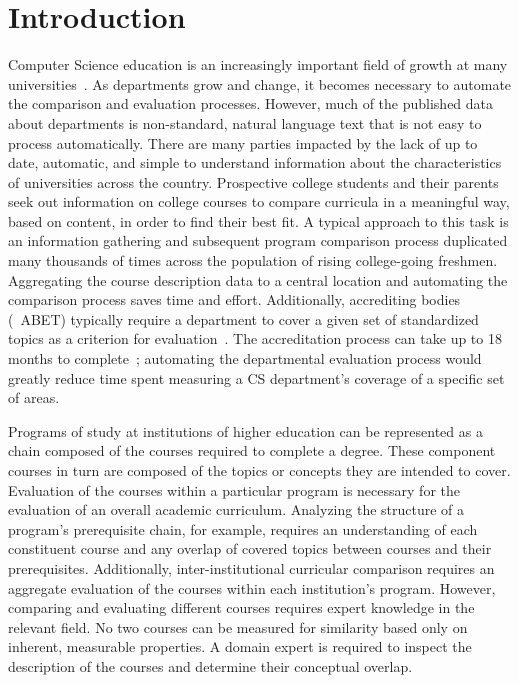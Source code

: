 \section{Introduction}
\label{sec:introduction}


Computer Science education is an increasingly important field of growth at many universities~\cite{zweben2011}.
As departments grow and change, it becomes necessary to automate the comparison and evaluation processes.
However, much of the published data about departments is non-standard, natural language text that is not easy to process automatically.
There are many parties impacted by the lack of up to date, automatic, and simple to understand information about the characteristics of universities across the country.
Prospective college students and their parents seek out information on college courses to compare curricula in a meaningful way, based on content, in order to find their best fit.
A typical approach to this task is an information gathering and subsequent program comparison process duplicated many thousands of times across the population of rising college-going freshmen.
Aggregating the course description data to a central location and automating the comparison process saves time and effort.
Additionally, accrediting bodies (\eg\ ABET) typically require a department to cover a given set of standardized topics as a criterion for evaluation~\cite{ABET2015}.
The accreditation process can take up to 18 months to complete~\cite{ABET2015}; automating the departmental evaluation process would greatly reduce time spent measuring a CS department's coverage of a specific set of areas.


Programs of study at institutions of higher education can be represented as a chain composed of the courses required to complete a degree.
These component courses in turn are composed of the topics or concepts they are intended to cover.
Evaluation of the courses within a particular program is necessary for the evaluation of an overall academic curriculum.
Analyzing the structure of a program's prerequisite chain, for example, requires an understanding of each constituent course and any overlap of covered topics between courses and their prerequisites.
Additionally, inter-institutional curricular comparison requires an aggregate evaluation of the courses within each institution's program.
However, comparing and evaluating different courses requires expert knowledge in the relevant field.
No two courses can be measured for similarity based only on inherent, measurable properties.
A domain expert is required to inspect the description of the courses and determine their conceptual overlap.

